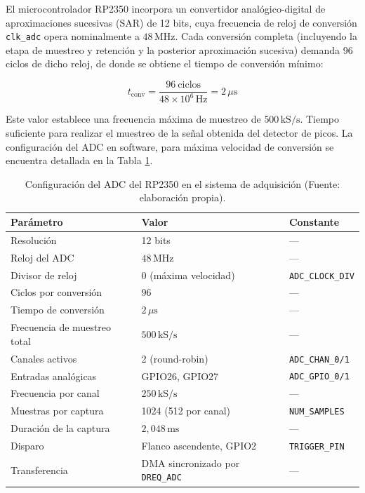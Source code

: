 El microcontrolador RP2350 incorpora un convertidor analógico-digital de aproximaciones sucesivas (SAR) de 12 bits, cuya frecuencia de reloj de conversión \texttt{clk\_adc} opera nominalmente a $48\,\mathrm{MHz}$. Cada conversión completa (incluyendo la etapa de muestreo y retención y la posterior aproximación sucesiva) demanda 96 ciclos de dicho reloj, de donde se obtiene el tiempo de conversión mínimo:

\begin{equation}
    t_{\mathrm{conv}} = \frac{96\ \mathrm{ciclos}}{48 \times 10^{6}\,\mathrm{Hz}} = 2\,\mu\mathrm{s}
    \label{eq:tconv_rp2350}
\end{equation}

Este valor establece una frecuencia máxima de muestreo de $500\,\mathrm{kS/s}$. Tiempo suficiente para realizar el muestreo de la señal obtenida del detector de picos. La configuración del ADC en software, para máxima velocidad de conversión se encuentra detallada en la Tabla \ref{tab:config_adc}.


\begin{table}[h]
\centering
\begin{tabular}{lll}
\hline
\textbf{Parámetro} & \textbf{Valor} & \textbf{Constante} \\
\hline
Resolución & 12 bits & --- \\
Reloj del ADC & $48\,\mathrm{MHz}$ & --- \\
Divisor de reloj & 0 (máxima velocidad) & \texttt{ADC\_CLOCK\_DIV} \\
Ciclos por conversión & 96 & --- \\
Tiempo de conversión & $2\,\mu\mathrm{s}$ & --- \\
Frecuencia de muestreo total & $500\,\mathrm{kS/s}$ & --- \\
Canales activos & 2 (round-robin) & \texttt{ADC\_CHAN\_0/1} \\
Entradas analógicas & GPIO26, GPIO27 & \texttt{ADC\_GPIO\_0/1} \\
Frecuencia por canal & $250\,\mathrm{kS/s}$ & --- \\
Muestras por captura & 1024 (512 por canal) & \texttt{NUM\_SAMPLES} \\
Duración de la captura & $2{,}048\,\mathrm{ms}$ & --- \\
Disparo & Flanco ascendente, GPIO2 & \texttt{TRIGGER\_PIN} \\
Transferencia & DMA sincronizado por \texttt{DREQ\_ADC} & --- \\
\hline
\end{tabular}
\caption{Configuración del ADC del RP2350 en el sistema de adquisición (Fuente: elaboración propia).}
\label{tab:config_adc}
\end{table}


